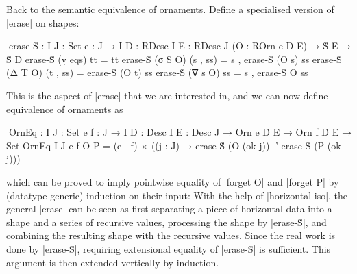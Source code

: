 Back to the semantic equivalence of ornaments.
Define a specialised version of |erase| on shapes:
\begin{code}
^^^erase-Ṡ :  {I J : Set} {e : J → I} {D : RDesc I} {E : RDesc J}
              (O : ROrn e D E) → Ṡ E → Ṡ D
erase-Ṡ (ṿ eqs)  tt        = tt
erase-Ṡ (σ S O)  (s , ss)  = s ,  erase-Ṡ (O s)  ss
erase-Ṡ (Δ T O)  (t , ss)  =      erase-Ṡ (O t)  ss
erase-Ṡ (∇ s O)  ss        = s ,  erase-Ṡ O      ss
\end{code}
This is the aspect of |erase| that we are interested in, and we can now define equivalence of ornaments as
\begin{code}
^^^OrnEq :  {I J : Set} {e f : J → I} {D : Desc I} {E : Desc J} →
            Orn e D E → Orn f D E → Set
OrnEq {I} {J} {e} {f} O P =
  (e ≐ f) × ((j : J) → erase-Ṡ (O (ok j)) ≊' erase-Ṡ (P (ok j)))
\end{code}
which can be proved to imply pointwise equality of |forget O| and |forget P| by (datatype-generic) induction on their input:
With the help of |horizontal-iso|, the general |erase| can be seen as first separating a piece of horizontal data into a shape and a series of recursive values, processing the shape by |erase-Ṡ|, and combining the resulting shape with the recursive values.
Since the real work is done by |erase-Ṡ|, requiring extensional equality of |erase-Ṡ| is sufficient.
This argument is then extended vertically by induction.

